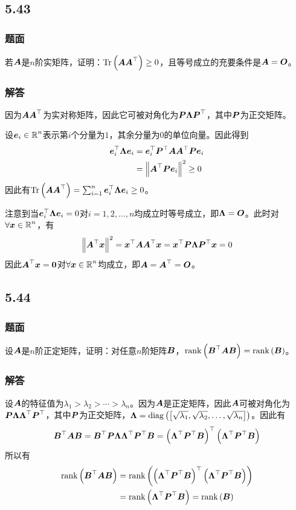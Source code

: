 \documentclass{beamer}
\begin{document}
\subsection*{5.43}
\begin{frame}
    \frametitle{题面}
    若\(\mata\)是\(n\)阶实矩阵，证明：\(\trace{\mata\mata^\top}\ge0\)，且等号成立的充要条件是\(\mata=\mato\)。
\end{frame}

\begin{frame}
    \frametitle{解答}
    因为\(\mata\mata^\top\)为实对称矩阵，因此它可被对角化为\(\matp\matlam\matp^\top\)，其中\(\matp\)为正交矩阵。

    设\(\vece_i\in\rea^n\)表示第\(i\)个分量为\(1\)，其余分量为\(0\)的单位向量。因此得到
    \begin{align*}
        \vece_i^\top\matlam\vece_i & =\vece_i^\top\matp^\top\mata\mata^\top\matp\vece_i \\
                                   & =\Abs{\mata^\top\matp\vece_i}^2\ge0
    \end{align*}
    因此有\(\trace{\mata\mata^\top}=\sum_{i=1}^n\vece_i^\top\matlam\vece_i\ge0\)。
    \pause

    注意到当\(\vece_i^\top\matlam\vece_i=0\)对\(i=1,2,\dots,n\)均成立时等号成立，即\(\matlam=\mato\)。此时对\(\forall\vecx\in\rea^n\)，有
    \begin{equation*}
        \Abs{\mata^\top\vecx}^2=\vecx^\top\mata\mata^\top\vecx=\vecx^\top\matp\matlam\matp^\top\vecx=0
    \end{equation*}
    因此\(\mata^\top\vecx=\veczero\)对\(\forall\vecx\in\rea^n\)均成立，即\(\mata=\mata^\top=\mato\)。
\end{frame}

\subsection*{5.44}
\begin{frame}
    \frametitle{题面}
    设\(\mata\)是\(n\)阶正定矩阵，证明：对任意\(n\)阶矩阵\(\matb\)，\(\rank{\matb^\top\mata\matb}=\rank{\matb}\)。
\end{frame}

\begin{frame}
    \frametitle{解答}
    设\(\mata\)的特征值为\(\lambda_1>\lambda_2>\cdots>\lambda_n\)。因为\(\mata\)是正定矩阵，因此\(\mata\)可被对角化为\(\matp\matlam\matlam^\top\matp^\top\)，其中\(\matp\)为正交矩阵，\(\matlam=\diag{\mat{\sqrt{\lambda_1},\sqrt{\lambda_2},\dots,\sqrt{\lambda_n}}}\)。因此有
    \begin{equation*}
        \matb^\top\mata\matb=\matb^\top\matp\matlam\matlam^\top\matp^\top\matb=\mypar{\matlam^\top\matp^\top\matb}^\top\mypar{\matlam^\top\matp^\top\matb}
    \end{equation*}
    \pause
    所以有
    \begin{align*}
        \rank{\matb^\top\mata\matb} & =\rank{\mypar{\matlam^\top\matp^\top\matb}^\top\mypar{\matlam^\top\matp^\top\matb}} \\
                                    & =\rank{\matlam^\top\matp^\top\matb}=\rank{\matb}
    \end{align*}
\end{frame}
\end{document}
